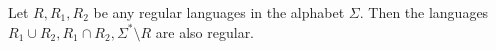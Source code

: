 

\setcounter{section}{3}
\setcounter{subsection}{1}
\setcounter{dfn}{0}

\begin{thm}
\label{thm:ClosRegLang}
Let $R, R_1, R_2$ be any regular languages in the alphabet $\Sigma$.
Then the languages $R_1 \cup R_2, R_1 \cap R_2, \Sigma^* \setminus R$ are also regular.
\end{thm}


